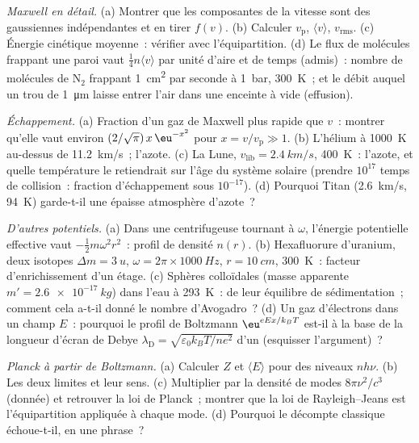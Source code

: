 \begin{exercise}[$\star\star$]\label{exo:b2:boltzmann-factor:8}
\emph{Maxwell en détail.} (a) Montrer que les composantes de la vitesse sont des
gaussiennes indépendantes et en tirer $f(v)$. (b) Calculer $v_{\text{p}}$,
$\langle v\rangle$, $v_{\text{rms}}$. (c) Énergie cinétique moyenne~: vérifier avec
l'équipartition. (d) Le flux de molécules frappant une paroi vaut
$\tfrac14n\langle v\rangle$ par unité d'aire et de temps (admis)~: nombre de
molécules de N$_2$ frappant \qty{1}{cm^2} par seconde à \qty{1}{bar},
\qty{300}{K}~; et le débit auquel un trou de \qty{1}{\micro m} laisse entrer l'air
dans une enceinte à vide (effusion).
\end{exercise}

\begin{exercise}[$\star\star$]\label{exo:b2:boltzmann-factor:9}
\emph{Échappement.} (a) Fraction d'un gaz de Maxwell plus rapide que $v$~: montrer qu'elle
vaut environ $(2/\sqrt\pi)\,x\,\eu^{-x^2}$ pour $x = v/v_{\text{p}} \gg 1$.
(b) L'hélium à \qty{1000}{K} au-dessus de \qty{11.2}{km/s}~; l'azote. (c) La Lune,
$v_{\text{lib}} = \qty{2.4}{km/s}$, \qty{400}{K}~: l'azote, et quelle
température le retiendrait sur l'âge du système solaire (prendre $10^{17}$
temps de collision~: fraction d'échappement sous $10^{-17}$). (d) Pourquoi Titan
(\qty{2.6}{km/s}, \qty{94}{K}) garde-t-il une épaisse atmosphère d'azote~?
\end{exercise}

\begin{exercise}[$\star\star\star$]\label{exo:b2:boltzmann-factor:10}
\emph{D'autres potentiels.} (a) Dans une centrifugeuse tournant à $\omega$,
l'énergie potentielle effective vaut $-\tfrac12m\omega^2r^2$~: profil de densité
$n(r)$. (b) Hexafluorure d'uranium, deux isotopes $\Delta m = \qty{3}{u}$, $\omega
= 2\pi \times \qty{1000}{Hz}$, $r = \qty{10}{cm}$, \qty{300}{K}~: facteur
d'enrichissement d'un étage. (c) Sphères colloïdales (masse apparente $m' =
\qty{2.6e-17}{kg}$) dans l'eau à \qty{293}{K}~:  de leur
équilibre de sédimentation~; comment cela a-t-il donné le nombre d'Avogadro~? (d) Un
gaz d'électrons dans un champ $E$~: pourquoi le profil de Boltzmann
$\eu^{eEx/k_BT}$ est-il à la base de la longueur d'écran de Debye
$\lambda_{\text{D}} = \sqrt{\varepsilon_0k_BT/ne^2}$ d'un  (esquisser
l'argument)~?
\end{exercise}

\begin{exercise}[$\star\star\star$]\label{exo:b2:boltzmann-factor:11}
\emph{Planck à partir de Boltzmann.} (a) Calculer $Z$ et $\langle E\rangle$ pour des
niveaux $nh\nu$. (b) Les deux limites et leur sens. (c) Multiplier par
la densité de modes $8\pi\nu^2/c^3$ (donnée) et retrouver la loi de Planck~;
montrer que la loi de Rayleigh--Jeans est l'équipartition appliquée à chaque mode.
(d) Pourquoi le décompte classique échoue-t-il, en une phrase~?
\end{exercise}

